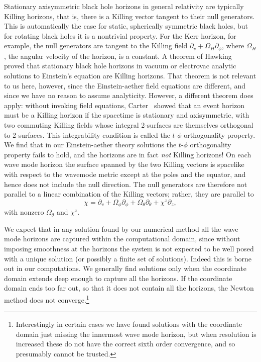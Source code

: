 \documentclass[12pt]{article}
\numberwithin{equation}{section}
\begin{document}
Stationary axisymmetric black hole horizons in general relativity are typically Killing horizons,
that is, there is a Killing vector tangent to their null generators.
This is automatically the case for static, spherically symmetric black holes, but for
rotating black holes it is a nontrivial property. For the Kerr horizon, for example, the
null generators are tangent to the Killing field $\partial_v + \Omega_H\partial_\phi$, where
$\Omega_H$, the angular velocity of the horizon, is a constant. 
A theorem of Hawking~\cite{Hawking:1971vc} proved 
that stationary black hole horizons
in vacuum or electrovac analytic solutions to Einstein's equation
are Killing horizons. That theorem is not relevant to us here, however,
since the Einstein-aether field equations are different, and since we have no reason to assume analyticity.
However, a different theorem does apply: without invoking field equations, Carter~\cite{Carter} showed that an event 
horizon must be a Killing horizon if the spacetime is 
stationary and axisymmetric, with two commuting
Killing fields whose integral
2-surfaces are themselves orthogonal to 2-surfaces. This integrability condition is called the $t$-$\phi$ orthogonality property. 
We find that in our 
Einstein-aether theory solutions
the $t$-$\phi$ orthogonality property
fails to hold, and 
the horizons are in fact {\it not} Killing
horizons! 
On each wave mode horizon the surface spanned by 
the two Killing vectors is spacelike with respect to the wavemode metric except at the poles and the equator,
and hence
does not include the 
null direction.
The null generators are therefore not parallel to a linear combination of
the Killing vectors; rather, they are parallel to
%
\begin{equation}\label{angvel}
    \chi =\partial_v + \Omega_{\phi} \partial_\phi + \Omega_{\theta} \partial_\theta + \chi^z \partial_z,
\end{equation}
%
with nonzero $\Omega_{\theta}$ and $\chi^z$.

We expect that in any solution found by our numerical method all the wave mode horizons are captured within the computational domain, 
since without imposing smoothness at the horizons the system is not expected to be well posed with a unique solution (or possibly a finite set of solutions). Indeed this is borne out in our computations. We generally find solutions only when the coordinate domain extends deep enough to capture all the horizons. If the coordinate domain ends too far out, so that it does not contain all the horizons, the Newton method does not converge.\footnote{Interestingly in certain cases we have found solutions with the coordinate domain just missing the innermost wave mode horizon, but when resolution is increased these do not have the correct sixth order convergence, and so presumably cannot be trusted.}
\end{document}
